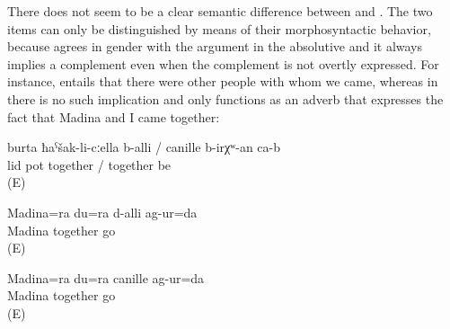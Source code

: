 There does not seem to be a clear semantic difference between  and  . The two items can only be distinguished by means of their morphosyntactic behavior, because  agrees in gender with the argument in the absolutive  and it always implies a complement even when the complement is not overtly expressed. For instance,  entails that there were other people with whom we came, whereas in  there is no such implication and  only functions as an adverb that expresses the fact that Madina and I came together:
%
\begin{exe}
	\ex	\label{ex:‎The lid should be together with the pot}
	\gll	burta	ħaˁšak-li-cːella	b-alli	/	canille	b-irχʷ-an	ca-b\\
		lid	pot	together	/	together	be	\\
	\glt	{} (E)

	\ex	\label{ex:‎Madina and I came together (with somebody else / with other people)}
	\gll	Madina=ra	du=ra	d-alli	ag-ur=da\\
		Madina		together	go\\
	\glt	{} (E)

	\ex	\label{ex:‎Madina and I came together}
	\gll	Madina=ra	du=ra	canille	ag-ur=da\\
		Madina		together	go\\
	\glt	{} (E)
\end{exe}

